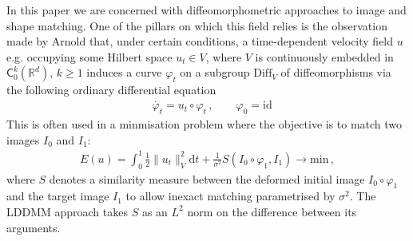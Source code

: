 \documentclass[runningheads]{llncs}
\newcommand{\half}{\frac 12}
\newcommand{\norm}[2]{\| #1 \|_{ #2 }}
\newcommand{\vnorm}[1]{\norm{ #1 }{V}}
\newcommand{\diff}[1]{\text{d} #1}
\newcommand{\Rd}{\mathbb{R}^{d}}
\begin{document}
In this paper we are concerned with diffeomorphometric approaches to image and
shape matching. One of the pillars on which this field relies is the observation
made by Arnold \cite{arnold1966geometrie} that, under certain conditions, a
time-dependent velocity field $u$ e.g. occupying some Hilbert space $u_t \in V$,
where $V$ is continuously embedded in $\textsf{C}_0^k(\Rd)$, $k\geq 1$ induces a
curve $\varphi_t$ on a subgroup $\text{Diff}_V$ of diffeomorphisms
\cite{younes2010shapes} via the following ordinary differential equation
\begin{align}
& \dot{\varphi_t} = u_t \circ \varphi_t\, , \qquad  \varphi_0 = \text{id}
  \label{diffeo}
\end{align}
This is often used in a minmisation problem where the objective is to match two
images $I_0$ and $I_1$:
\begin{align}
  E(u) = \int_0^1 \half\vnorm{u_t}^2 \diff{t} + \frac{1}{\sigma^2}
  S(I_0\circ\varphi_1, I_1)\longrightarrow \text{min}\, , \label{E-def}
\end{align}
where $S$ denotes a similarity measure between the deformed initial image
$I_0\circ \varphi_1$ and the target image $I_1$ to allow inexact matching
parametrised by $\sigma^2$. The LDDMM approach takes $S$ as an $L^2$ norm on
the difference between its arguments.\\
\end{document}
